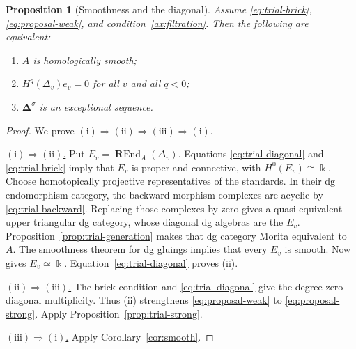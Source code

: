 \documentclass[11pt,a4paper]{article}
\newcommand{\RR}{\mathbf{R}}
\newcommand{\std}{\Delta}
\DeclareMathOperator{\REnd}{\RR End}
\theoremstyle{plain}
\newtheorem{proposition}[theorem]{Proposition}
\theoremstyle{definition}
\numberwithin{equation}{section}
\begin{document}
\begin{proposition}[Smoothness and the diagonal]
\label{prop:trial-smooth-diagonal}
Assume \eqref{eq:trial-brick}, \eqref{eq:proposal-weak}, and
condition~\ref{ax:filtration}. Then the following are equivalent:
\begin{enumerate}[label=\textup{(\roman*)}]
 \item $A$ is homologically smooth;
 \item $H^{q}(\std_v)e_v=0$ for all $v$ and all $q<0$;
 \item $\boldsymbol\std^\sigma$ is an exceptional sequence.
\end{enumerate}
\end{proposition}
\begin{proof}
We prove $(\mathrm{i})\Rightarrow(\mathrm{ii})
\Rightarrow(\mathrm{iii})\Rightarrow(\mathrm{i})$.

\noindent\underline{$(\mathrm{i})\Rightarrow(\mathrm{ii})$.}
Put $E_v=\REnd_A(\std_v)$. Equations
\eqref{eq:trial-diagonal} and \eqref{eq:trial-brick} imply that
$E_v$ is proper and connective, with $H^0(E_v)\cong\Bbbk$.
Choose homotopically projective representatives of the standards.
In their dg endomorphism category, the backward morphism complexes
are acyclic by \eqref{eq:trial-backward}. Replacing those complexes
by zero gives a quasi-equivalent upper triangular dg category,
whose diagonal dg algebras are the $E_v$.
Proposition~\ref{prop:trial-generation} makes that dg category
Morita equivalent to $A$. The smoothness theorem for dg gluings
\cite[Theorem 3.25]{Orl16} implies that every $E_v$ is smooth.
Now \cite[Proposition 7.4]{RS22} gives $E_v\simeq\Bbbk$.
Equation~\eqref{eq:trial-diagonal} proves (ii).

\noindent\underline{$(\mathrm{ii})\Rightarrow(\mathrm{iii})$.}
The brick condition and \eqref{eq:trial-diagonal} give the
degree-zero diagonal multiplicity. Thus (ii) strengthens
\eqref{eq:proposal-weak} to \eqref{eq:proposal-strong}.
Apply Proposition~\ref{prop:trial-strong}.

\noindent\underline{$(\mathrm{iii})\Rightarrow(\mathrm{i})$.}
Apply Corollary~\ref{cor:smooth}.
\end{proof}
\end{document}
